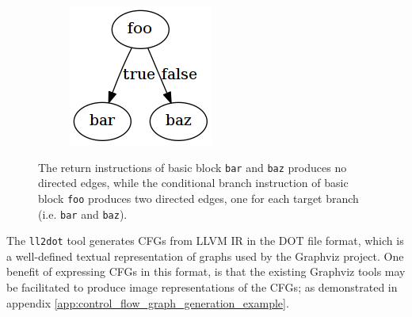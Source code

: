 \begin{figure}[htbp]
	\centering
	\begin{subfigure}[ht]{0.54\textwidth}
		
	\end{subfigure}
	\enskip
	\begin{subfigure}[ht]{0.22\textwidth}
		\includegraphics[width=\textwidth]{inc/cond_br.png}
	\end{subfigure}
	\caption{The return instructions of basic block \texttt{bar} and \texttt{baz} produces no directed edges, while the conditional branch instruction of basic block \texttt{foo} produces two directed edges, one for each target branch (i.e. \texttt{bar} and \texttt{baz}).}
	\label{fig:cond_br_cfg}
\end{figure}


The \texttt{ll2dot} tool generates CFGs from LLVM IR in the DOT file format, which is a well-defined textual representation of graphs used by the Graphviz project. One benefit of expressing CFGs in this format, is that the existing Graphviz tools may be facilitated to produce image representations of the CFGs; as demonstrated in appendix \ref{app:control_flow_graph_generation_example}.
